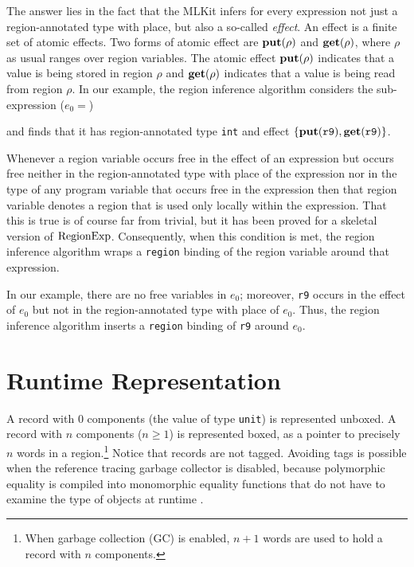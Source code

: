 \documentclass[12pt]{book}
\begin{document}
The answer lies in the fact that the MLKit infers for every expression
not just a region-annotated type with place, but also a so-called
%
%
{\em effect}.  An effect is a finite set of
%
%
atomic effects. Two forms of atomic effect are
%
%
$\mathop{\bf put}\nolimits(\rho)$ and
%
%
$\mathop{\bf get}\nolimits(\rho)$, where $\rho$ as usual ranges over region variables. The atomic
effect $\mathop{\bf put}\nolimits(\rho)$ indicates that a value is being stored in region $\rho$ and
$\mathop{\bf get}\nolimits(\rho)$ indicates that a value is being read from region $\rho$.  In our
example, the region inference algorithm considers the sub-expression ($e_0=$)
and finds that it has region-annotated type \lstinline{int} and effect
$\{\mathop{\bf put}\nolimits(\hbox{\tt r9}), \mathop{\bf get}\nolimits(\hbox{\tt r9})\}$.

Whenever a region variable occurs free in the effect of an expression but occurs
free neither in the region-annotated type with place of the expression nor in
the type of any program variable that occurs free in the expression then that
region variable denotes a region that is used only locally within the
expression.  That this is true is of course far from trivial, but it has been
proved for a skeletal version of $\hbox{\rm RegionExp}$.  Consequently, when this condition
is met, the region inference algorithm wraps a
%
%
\lstinline{region} binding of the region variable around that expression.

In our example, there are no free variables in $e_0$; moreover, \lstinline{r9}
occurs in the effect of $e_0$ but not in the region-annotated type with place of
$e_0$. Thus, the region inference algorithm inserts a \lstinline{region} binding of
\lstinline{r9} around $e_0$.

\section{Runtime Representation}
A
%
%
record with 0 components (the value of type
%
%
\lstinline{unit}) is represented unboxed.  A record with $n$ components ($n\geq 1$) is
represented boxed, as a pointer to precisely $n$ words in a
region.\footnote{When garbage collection (GC) is enabled, $n+1$ words are used
to hold a record with $n$ components.}  Notice that records are not
tagged. Avoiding tags is possible when the reference tracing garbage collector
is disabled, because
%
%
polymorphic equality is compiled into
%
%
monomorphic equality functions that do not have to examine the type of objects
at runtime \cite{ElsmanTIC98}.
\end{document}
